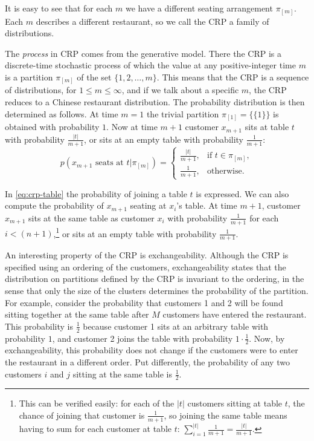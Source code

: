 It is easy to see that for each $m$ we have a different seating arrangement $\pi_{[m]}$. Each $m$ describes a different restaurant, so we call the CRP a family of distributions.

The \emph{process}\/ in CRP comes from the generative model. There the CRP is a discrete-time stochastic process of which the value at any positive-integer time $m$ is a partition $\pi_{[m]}$ of the set $\{1,2,\ldots,m\}$. This means that the CRP is a sequence of distributions, for $1\leq m \leq\infty$, and if we talk about a specific $m$, the CRP reduces to a Chinese restaurant distribution. The probability distribution is then determined as follows. At time $m=1$ the trivial partition $\pi_{[1]}=\{\{1\}\}$ is obtained with probability $1$. 
Now at time $m+1$ customer $x_{m+1}$ sits at table $t$ with probability $\frac{|t|}{m+1}$, or sits at an empty table with probability $\frac{1}{m+1}$: 
\begin{equation}\label{eq:crp-table}
	p(x_{m+1}\text{ seats at }t|\pi_{[m]}) = 
    \begin{cases}
    	\frac{|t|}{m+1}, & \text{if }t\in\pi_{[m]},\\
    	\frac{1}{m+1}, & \text{otherwise}.
  	\end{cases}
\end{equation}

In \cref{eq:crp-table} the probability of joining a table $t$ is expressed. We can also compute the probability of $x_{m+1}$ seating at $x_i$'s table. At time $m+1$, customer $x_{m+1}$ sits at the same table as customer $x_i$ with probability $\frac{1}{m+1}$ for each $i<(n+1)$,\footnote{This can be verified easily: for each of the $|t|$ customers sitting at table $t$, the chance of joining that customer is $\frac{1}{m+1}$, so joining the same table means having to sum for each customer at table $t$: $\sum_{i=1}^{|t|} \frac{1}{m+1} = \frac{|t|}{m+1}$.} or sits at an empty table with probability $\frac{1}{m+1}$. 

An interesting property of the CRP is exchangeability. Although the CRP is specified using an ordering of the customers, exchangeability states that the distribution on partitions defined by the CRP is invariant to the ordering, in the sense that only the size of the clusters determines the probability of the partition. For example, consider the probability that customers 1 and 2 will be found sitting together at the same table after $M$ customers have entered the restaurant. This probability is $\frac{1}{2}$ because customer 1 sits at an arbitrary table with probability $1$, and customer 2 joins the table with probability $1\cdot\frac{1}{2}$. Now, by exchangeability, this probability does not change if the customers were to enter the restaurant in a different order. Put differently, the probability of any two customers $i$ and $j$ sitting at the same table is $\frac{1}{2}$.
%
%

